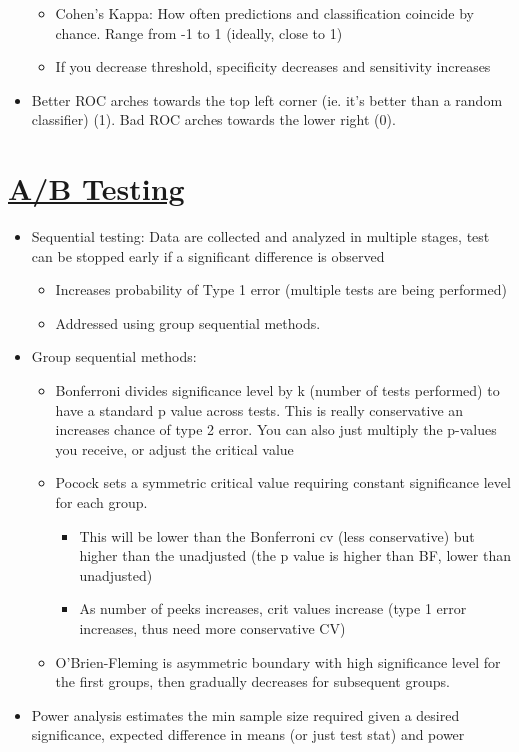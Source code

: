 \documentclass[8pt,landscape,a4paper, fleqn, dvipsnames]{extarticle}
\begin{document}
\begin{multicols*}{4}
\begin{itemize}
\begin{itemize}
        \item Cohen's Kappa: How often predictions and classification coincide by chance. Range from -1 to 1 (ideally, close to 1)
        \item If you decrease threshold, specificity decreases and sensitivity increases
    \end{itemize}
    \item Better ROC arches towards the top left corner (ie. it's better than a random classifier) (1). Bad ROC arches towards the lower right (0).
\end{itemize}

\section*{\ul{A/B Testing}}
\begin{itemize}
    \item Sequential testing: Data are collected and analyzed in multiple stages, test can be stopped early if a significant difference is observed
    \begin{itemize}
        \item Increases probability of Type 1 error (multiple tests are being performed)
        \item Addressed using group sequential methods. 
    \end{itemize}
    \item Group sequential methods:
    \begin{itemize}
        \item Bonferroni divides significance level by k (number of tests performed) to have a standard p value across tests. This is really conservative an increases chance of type 2 error. You can also just multiply the p-values you receive, or adjust the critical value
        \item Pocock sets a symmetric critical value requiring constant significance level for each group. 
        \begin{itemize}
            \item This will be lower than the Bonferroni cv (less conservative) but higher than the unadjusted (the p value is higher than BF, lower than unadjusted)
            \item As number of peeks increases, crit values increase (type 1 error increases, thus need more conservative CV)
        \end{itemize}
        \item O'Brien-Fleming is asymmetric boundary with high significance level for the first groups, then gradually decreases for subsequent groups.
    \end{itemize}
    \item Power analysis estimates the min sample size required given a desired significance, expected difference in means (or just test stat) and power
\end{itemize}

\end{multicols*}
\end{document}
